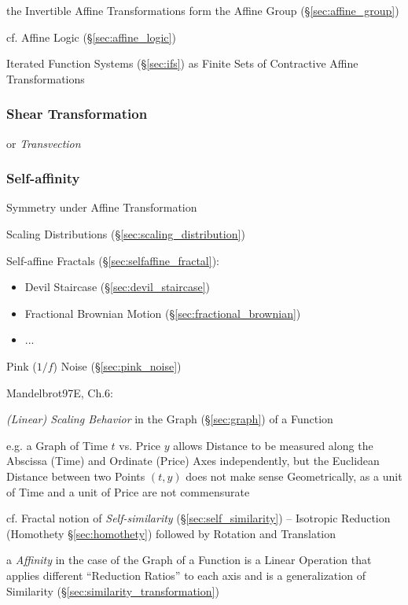 the Invertible Affine Transformations form the Affine Group
(\S\ref{sec:affine_group})

cf. Affine Logic (\S\ref{sec:affine_logic})

\fist Iterated Function Systems (\S\ref{sec:ifs}) as Finite Sets of Contractive
Affine Transformations



\subsubsection{Shear Transformation}\label{sec:shear_transformation}


or \emph{Transvection}



\subsubsection{Self-affinity}\label{sec:self_affinity}

Symmetry under Affine Transformation

\fist Scaling Distributions (\S\ref{sec:scaling_distribution})

\fist Self-affine Fractals (\S\ref{sec:selfaffine_fractal}):
\begin{itemize}
  \item Devil Staircase (\S\ref{sec:devil_staircase})
  \item Fractional Brownian Motion (\S\ref{sec:fractional_brownian})
  \item ...
\end{itemize}

\fist Pink ($1/f$) Noise (\S\ref{sec:pink_noise})

Mandelbrot97E, Ch.6:

\emph{(Linear) Scaling Behavior} in the Graph (\S\ref{sec:graph}) of a Function

e.g. a Graph of Time $t$ vs. Price $y$ allows Distance to be measured along the
Abscissa (Time) and Ordinate (Price) Axes independently, but the Euclidean
Distance between two Points $(t, y)$ does not make sense Geometrically, as a
unit of Time and a unit of Price are not commensurate

\fist cf. Fractal notion of \emph{Self-similarity} (\S\ref{sec:self_similarity})
-- Isotropic Reduction (Homothety \S\ref{sec:homothety}) followed by Rotation
and Translation

a \emph{Affinity} in the case of the Graph of a Function is a Linear Operation
that applies different ``Reduction Ratios'' to each axis and is a generalization
of Similarity (\S\ref{sec:similarity_transformation})

